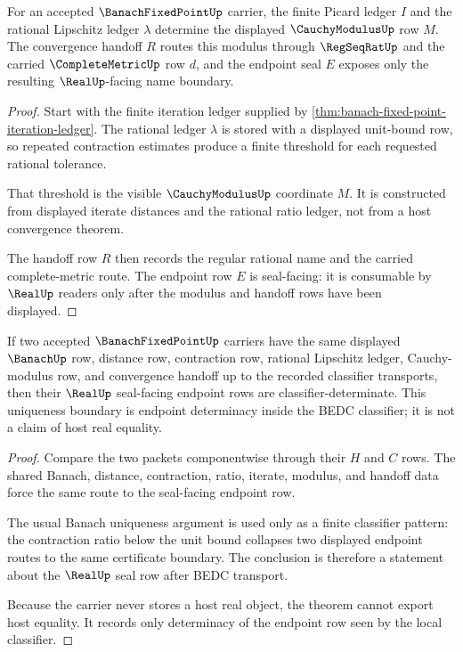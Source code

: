 \begin{theorem}
\label{thm:banach-fixed-point-cauchy-handoff}
For an accepted $\BanachFixedPointUp$ carrier, the finite Picard ledger $I$ and the rational Lipschitz ledger $\lambda$ determine the displayed $\CauchyModulusUp$ row $M$. The convergence handoff $R$ routes this modulus through $\RegSeqRatUp$ and the carried $\CompleteMetricUp$ row $d$, and the endpoint seal $E$ exposes only the resulting $\RealUp$-facing name boundary.
\end{theorem}
\begin{proof}
Start with the finite iteration ledger supplied by \autoref{thm:banach-fixed-point-iteration-ledger}. The rational ledger $\lambda$ is stored with a displayed unit-bound row, so repeated contraction estimates produce a finite threshold for each requested rational tolerance.

That threshold is the visible $\CauchyModulusUp$ coordinate $M$. It is constructed from displayed iterate distances and the rational ratio ledger, not from a host convergence theorem.

The handoff row $R$ then records the regular rational name and the carried complete-metric route. The endpoint row $E$ is seal-facing: it is consumable by $\RealUp$ readers only after the modulus and handoff rows have been displayed.
\end{proof}

\begin{theorem}
\label{thm:banach-fixed-point-uniqueness-boundary}
If two accepted $\BanachFixedPointUp$ carriers have the same displayed $\BanachUp$ row, distance row, contraction row, rational Lipschitz ledger, Cauchy-modulus row, and convergence handoff up to the recorded classifier transports, then their $\RealUp$ seal-facing endpoint rows are classifier-determinate. This uniqueness boundary is endpoint determinacy inside the BEDC classifier; it is not a claim of host real equality.
\end{theorem}
\begin{proof}
Compare the two packets componentwise through their $H$ and $C$ rows. The shared Banach, distance, contraction, ratio, iterate, modulus, and handoff data force the same route to the seal-facing endpoint row.

The usual Banach uniqueness argument is used only as a finite classifier pattern: the contraction ratio below the unit bound collapses two displayed endpoint routes to the same certificate boundary. The conclusion is therefore a statement about the $\RealUp$ seal row after BEDC transport.

Because the carrier never stores a host real object, the theorem cannot export host equality. It records only determinacy of the endpoint row seen by the local classifier.
\end{proof}

